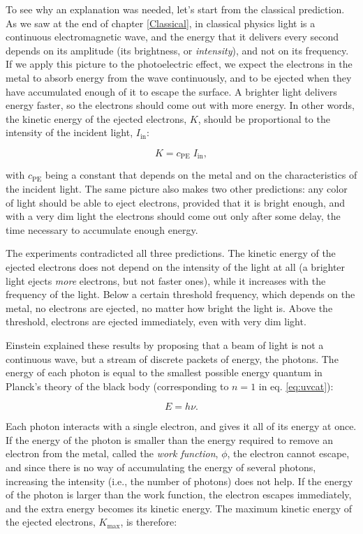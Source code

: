 \documentclass[
  english,
  9pt,
]{extbook}
\theoremstyle{definition}
\theoremstyle{definition}
\theoremstyle{definition}
\theoremstyle{definition}
\theoremstyle{remark}
\begin{document}
To see why an explanation was needed, let's start from the classical prediction. As we saw at the end of chapter \ref{Classical}, in classical physics light is a continuous electromagnetic wave, and the energy that it delivers every second depends on its amplitude (its brightness, or \emph{intensity}), and not on its frequency. If we apply this picture to the photoelectric effect, we expect the electrons in the metal to absorb energy from the wave continuously, and to be ejected when they have accumulated enough of it to escape the surface. A brighter light delivers energy faster, so the electrons should come out with more energy. In other words, the kinetic energy of the ejected electrons, \(K\), should be proportional to the intensity of the incident light, \(I_{\text{in}}\):

\begin{equation}
K= c_{\text{PE}} \; I_{\text{in}},
\label{eq:pe3}
\end{equation}

with \(c_{\text{PE}}\) being a constant that depends on the metal and on the characteristics of the incident light. The same picture also makes two other predictions: any color of light should be able to eject electrons, provided that it is bright enough, and with a very dim light the electrons should come out only after some delay, the time necessary to accumulate enough energy.

The experiments contradicted all three predictions. The kinetic energy of the ejected electrons does not depend on the intensity of the light at all (a brighter light ejects \emph{more} electrons, but not faster ones), while it increases with the frequency of the light. Below a certain threshold frequency, which depends on the metal, no electrons are ejected, no matter how bright the light is. Above the threshold, electrons are ejected immediately, even with very dim light.

Einstein explained these results by proposing that a beam of light is not a continuous wave, but a stream of discrete packets of energy, the photons. The energy of each photon is equal to the smallest possible energy quantum in Planck's theory of the black body (corresponding to \(n=1\) in eq. \eqref{eq:uvcat}):

\begin{equation}
E = h \nu.
\label{eq:pe0}
\end{equation}

Each photon interacts with a single electron, and gives it all of its energy at once. If the energy of the photon is smaller than the energy required to remove an electron from the metal, called the \emph{work function}, \(\phi\), the electron cannot escape, and since there is no way of accumulating the energy of several photons, increasing the intensity (i.e., the number of photons) does not help. If the energy of the photon is larger than the work function, the electron escapes immediately, and the extra energy becomes its kinetic energy. The maximum kinetic energy of the ejected electrons, \(K_{\text{max}}\), is therefore:
\end{document}
